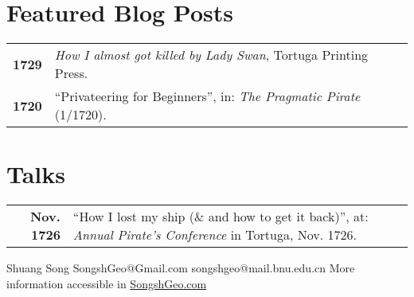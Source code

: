 \documentclass[lighthipster]{simplehipstercv}
\newlength{\rightcolwidth}
\begin{document}
\begin{paracol}{2}
\begin{minipage}[t]{0.3\textwidth}
    \end{minipage}\hfill
    \begin{minipage}[t]{0.3\textwidth}
    \section*{Featured Blog Posts}
    \begin{tabular}{>{\footnotesize\bfseries}r >{\footnotesize}p{}}
        1729 & \emph{How I almost got killed by Lady Swan}, Tortuga Printing Press. \\
        1720 & ``Privateering for Beginners'', in: \emph{The Pragmatic Pirate} (1/1720).
    \end{tabular}
    \bigskip
    
    \section*{Talks}
    \begin{tabular}{>{\footnotesize\bfseries}r >{\footnotesize}p{}}
        Nov. 1726 & ``How I lost my ship (\& and how to get it back)'', at: \emph{Annual Pirate's Conference} in Tortuga, Nov. 1726.
    \end{tabular}
\end{minipage}
    
    
    


\vfill{} %

\setlength{\parindent}{0pt}
\begin{minipage}[t]{\rightcolwidth}
\begin{center}\fontfamily{\sfdefault}\selectfont \color{black!70}
{\small Shuang Song  SongshGeo@Gmail.com  songshgeo@mail.bnu.edu.cn \newline{} More information accessible in \href{www.songshgeo.com}{SongshGeo.com}
}
\end{center}
\end{minipage}

\end{paracol}
\end{document}

